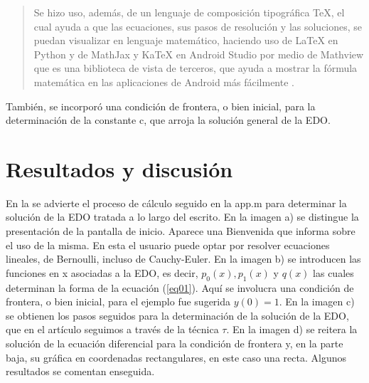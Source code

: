 \documentclass[spanish]{textolivre}
\begin{document}
\begin{quote}
Se hizo uso, además, de un lenguaje de composición tipográfica TeX, el cual ayuda a que las ecuaciones, sus pasos de resolución y las soluciones, se puedan visualizar en lenguaje matemático, haciendo uso de LaTeX en Python y de MathJax y KaTeX en Android Studio por medio de Mathview que es una biblioteca de vista de terceros, que ayuda a mostrar la fórmula matemática en las aplicaciones de Android más fácilmente \cite[p. 25]{garcia2020}.
\end{quote}

También, se incorporó una condición de frontera, o bien inicial, para la determinación de la constante c, que arroja la solución general de la EDO. 

\section{Resultados y discusión}
En la  se advierte el proceso de cálculo seguido en la app.m para determinar la solución de la EDO tratada a lo largo del escrito. En la imagen a) se distingue la presentación de la pantalla de inicio. Aparece una Bienvenida que informa sobre el uso de la misma. En esta el usuario puede optar por resolver ecuaciones lineales, de Bernoulli, incluso de Cauchy-Euler. En la imagen b) se introducen las funciones en x asociadas a la EDO, es decir, $p_{0}(x), p_{1}(x)$ y $q(x)$ las cuales determinan la forma de la ecuación (\ref{eq01}). Aquí se involucra una condición de frontera, o bien inicial, para el ejemplo fue sugerida $y(0) = 1$. En la imagen c) se obtienen los pasos seguidos para la determinación de la solución de la EDO, que en el artículo seguimos a través de la técnica $\tau$. En la imagen d) se reitera la solución de la ecuación diferencial para la condición de frontera y, en la parte baja, su gráfica en coordenadas rectangulares, en este caso una recta. Algunos resultados se comentan enseguida.
\end{document}
